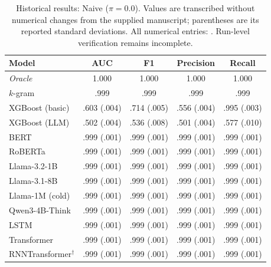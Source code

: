 \begin{table}[H]
\centering\small
\caption{Historical results: Naive ($\pi=0.0$). Values are transcribed without numerical changes from the supplied manuscript; parentheses are its reported standard deviations. All numerical entries: \ou. Run-level verification remains incomplete.}
\begin{tabular}{@{}lcccc@{}}\toprule
Model & AUC & F1 & Precision & Recall \\\midrule
\textit{Oracle} & 1.000 & 1.000 & 1.000 & 1.000 \\
$k$-gram & .999 & .999 & .999 & .999 \\
XGBoost (basic) & .603 (.004) & .714 (.005) & .556 (.004) & .995 (.003) \\
XGBoost (LLM) & .502 (.004) & .536 (.008) & .501 (.004) & .577 (.010) \\
BERT & .999 (.001) & .999 (.001) & .999 (.001) & .999 (.001) \\
RoBERTa & .999 (.001) & .999 (.001) & .999 (.001) & .999 (.001) \\
Llama-3.2-1B & .999 (.001) & .999 (.001) & .999 (.001) & .999 (.001) \\
Llama-3.1-8B & .999 (.001) & .999 (.001) & .999 (.001) & .999 (.001) \\
Llama-1M (cold) & .999 (.001) & .999 (.001) & .999 (.001) & .999 (.001) \\
Qwen3-4B-Think & .999 (.001) & .999 (.001) & .999 (.001) & .999 (.001) \\
LSTM & .999 (.001) & .999 (.001) & .999 (.001) & .999 (.001) \\
Transformer & .999 (.001) & .999 (.001) & .999 (.001) & .999 (.001) \\
RNNTransformer$^{\dagger}$ & .999 (.001) & .999 (.001) & .999 (.001) & .999 (.001) \\
\bottomrule\end{tabular}
\end{table}
